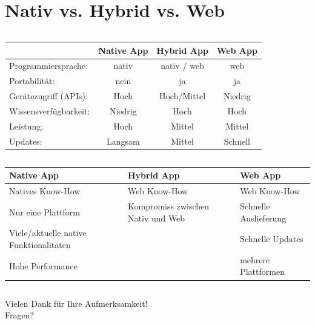 \documentclass[xcolor=dvipsnames]{beamer}
\begin{document}
\renewcommand{\arraystretch}{1.5}
\section{Nativ vs. Hybrid vs. Web}

\begin{frame}
	\begin{columns}[t,onlytextwidth]
		\begin{tabular}{ l | c | c | c }
			& {\large \textcolor{cordovablue}{Native App}} & {\large \textcolor{cordovablue}{Hybrid App}} & {\large \textcolor{cordovablue}{Web App}} \\
			\hline
			Programmiersprache: & nativ & nativ / web & web \\
			Portabilität: & nein & ja & ja \\
			Gerätezugriff (APIs): & Hoch & Hoch/Mittel & Niedrig \\
			Wissensverfügbarkeit: & Niedrig & Hoch & Hoch \\
			Leistung: & Hoch & Mittel & Mittel \\
			Updates: & Langsam & Mittel & Schnell \\
		\end{tabular}
	\end{columns}
\end{frame}

\begin{frame}
	\begin{columns}[t,onlytextwidth]
		\begin{tabular}{ p{3.2cm} | p{3.2cm} | p{3.2cm} }
			{\large \textcolor{cordovablue}{Native App}} & {\large \textcolor{cordovablue}{Hybrid App}} & {\large \textcolor{cordovablue}{Web App}} \\
			\hline
			Natives Know-How & Web Know-How & Web Know-How \\
			Nur eine Plattform & Kompromiss zwischen Nativ und Web & Schnelle Auslieferung \\
			Viele/aktuelle native Funktionalitäten &  & Schnelle Updates \\
			Hohe Performance &  & mehrere Plattformen \\
		\end{tabular}
	\end{columns}
\end{frame}

\begin{frame}
	\centering
	\textcolor{cordovablue}{{\LARGE Vielen Dank für Ihre Aufmerksamkeit!\\[6ex] Fragen?}}
\end{frame}
\end{document}
